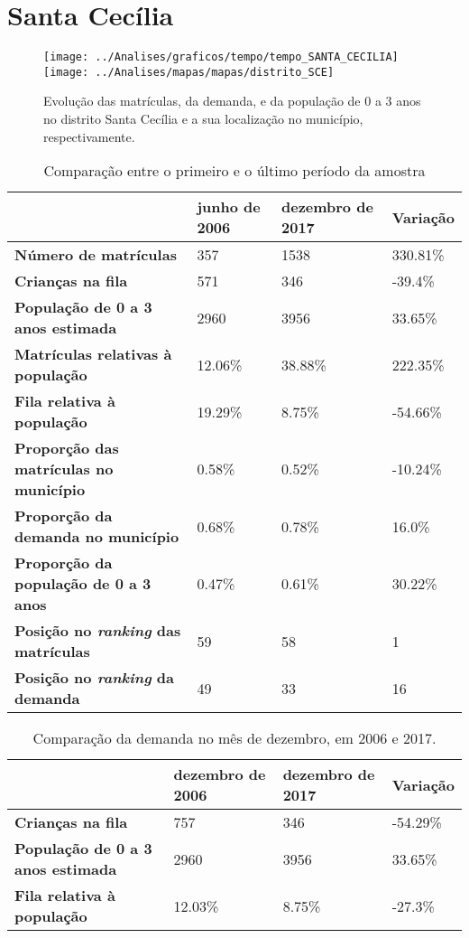 \section{Santa Cecília}
\begin{figure}[H]
	\centering
	\texttt{[image: ../Analises/graficos/tempo/tempo\_SANTA\_CECILIA]}
	\texttt{[image: ../Analises/mapas/mapas/distrito\_SCE]}
	\caption{Evolução das matrículas, da demanda, e da população de 0 a 3 anos no distrito Santa Cecília e a sua localização no município, respectivamente.}
\end{figure}
\begin{table}[H]
	\begin{tabular}{|l|l|l|l|}
		\hline
		\textbf{}                                      & \textbf{junho de 2006}       & \textbf{dezembro de 2017}    & \textbf{Variação} \\ \hline
		\textbf{Número de matrículas}                  & 357 & 1538 & 330.81\% \\ \hline
		\textbf{Crianças na fila}                      & 571 & 346 & -39.4\% \\ \hline
		\textbf{População de 0 a 3 anos estimada}      & 2960 & 3956 & 33.65\% \\ \hline
		\textbf{Matrículas relativas à população}      & 12.06\% & 38.88\% & 222.35\% \\ \hline
		\textbf{Fila relativa à população}             & 19.29\% & 8.75\% & -54.66\% \\ \hline
		\textbf{Proporção das matrículas no município} & 0.58\% & 0.52\% & -10.24\% \\ \hline
		\textbf{Proporção da demanda no município}     & 0.68\% & 0.78\% & 16.0\% \\ \hline
		\textbf{Proporção da população de 0 a 3 anos}  & 0.47\% & 0.61\% & 30.22\% \\ \hline
		\textbf{Posição no \textit{ranking} das matrículas}     & 59 & 58 & 1 \\ \hline
		\textbf{Posição no \textit{ranking} da demanda}         & 49 & 33 & 16 \\ \hline
	\end{tabular}
	\caption{Comparação entre o primeiro e o último período da amostra}
\end{table}
\begin{table}[H]
	\begin{tabular}{|l|l|l|l|}
		\hline
		\textbf{}                                 & \textbf{dezembro de 2006} & \textbf{dezembro de 2017} & \textbf{Variação} \\ \hline
		\textbf{Crianças na fila}                      & 757 & 346 & -54.29\% \\ \hline
		\textbf{População de 0 a 3 anos estimada}      & 2960 & 3956 & 33.65\% \\ \hline
		\textbf{Fila relativa à população}             & 12.03\% & 8.75\% & -27.3\% \\ \hline
	\end{tabular}
	\caption{Comparação da demanda no mês de dezembro, em 2006 e 2017.}
\end{table}
